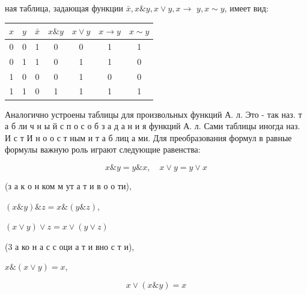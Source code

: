 \documentclass[10pt]{article}
\begin{document}
ная таблица, задающая функции $\bar{x}, x \& y, x \vee y, x \rightarrow$ $y, x \sim y$, имеет вид:



\begin{center}

\begin{tabular}{c|c|c|c|c|c|c}

\hline

$x$ & $y$ & $\bar{x}$ & $x \& y$ & $x \vee y$ & $x \rightarrow y$ & $x \sim y$ \\

\hline

0 & 0 & 1 & 0 & 0 & 1 & 1 \\

0 & 1 & 1 & 0 & 1 & 1 & 0 \\

1 & 0 & 0 & 0 & 1 & 0 & 0 \\

1 & 1 & 0 & 1 & 1 & 1 & 1 \\

\hline

\end{tabular}

\end{center}



Аналогично устроены таблицы для произвольных функций А. л. Это - так наз. т а б ли ч н ы й с п о с о б з а д а н и я функций А. л. Сами таблицы иногда наз. И с т И н о о с т ным и т а б лиц а ми. Для преобразования формул в равные формулы важную роль играют следующие равенства:



\[

x \& y=y \& x, \quad x \vee y=y \vee x

\]



(з а к о н ком м ут а т и в о о ти),



$(x \& y) \& z=x \&(y \& z)$,



$(x \vee y) \vee z=x \vee(y \vee z)$



(3 а ко н а с с оци а т и вно с т и),



$x \&(x \vee y)=x$,



\[

x \vee(x \& y)=x

\]
\end{document}
